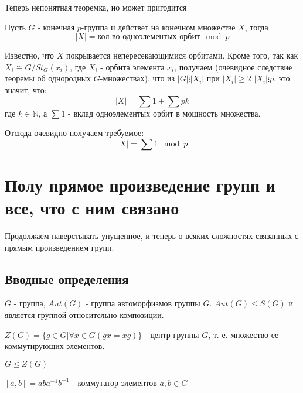 Теперь непонятная теоремка, но может пригодится

\begin{Th}
Пусть $G$ - конечная $p$-группа и действет на конечном множестве $X$, тогда
\[
	\left|X\right| = \text{кол-во одноэлементых орбит} \mod p
\]
\end{Th}

\begin{Def}
Известно, что $X$ покрывается непересекающимися орбитами. Кроме того, так как $X_i \cong G / St_G\left(x_i\right)$, где $X_i$ - орбита элемента $x_i$, получаем (очевидное следствие теоремы об однородных $G$-множествах), что из $\left|G\right| \vdots \left|X_i\right|$ при $\left|X_i\right| \ge 2$ $\left|X_i\right| \vdots p$, это значит, что:
\[
	\left|X\right| = \sum 1 + \sum p k
\]
где $k \in \mathbb{N}$, а $\sum 1$ - вклад одноэлементых орбит в мощность множества.

Отсюда очевидно получаем требуемое:
\[
	\left|X\right| = \sum 1 \mod p
\]
\end{Def}

\chapter{Полу прямое произведение групп и все, что с ним связано}

Продолжаем наверстывать упущенное, и теперь о всяких сложностях связанных с прямым произведением групп.

\section{Вводные определения}

\begin{Def}
$G$ - группа, $Aut\left(G\right)$ - группа автоморфизмов группы $G$. $Aut\left(G\right) \le S\left(G\right)$ и является группой относительно композиции.
\end{Def}

\begin{Def}
$Z\left(G\right) = \lbrace g \in G | \forall x \in G \left(gx = xg\right)\rbrace$ - центр группы $G$, т. е. множество ее коммутирующих элементов.

$G \trianglelefteq Z\left(G\right)$
\end{Def}

\begin{Def}
$\left[a, b\right] = aba^{-1}b^{-1}$ - коммутатор элементов $a,b \in G$
\end{Def}

